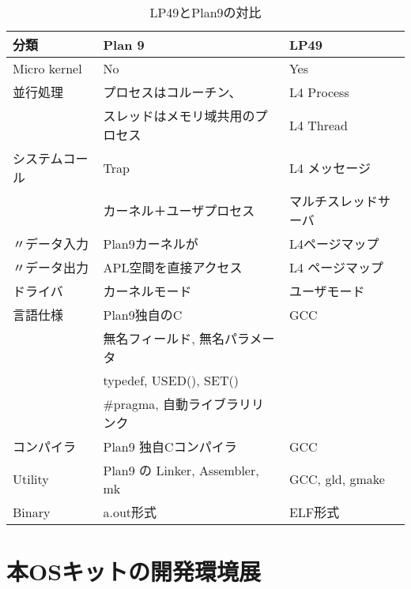 \documentclass[draft]{ipsjpapers}
\begin{document}
\begin{table}[htb]
\caption[Plan9vsLP40]{LP49とPlan9の対比 }
\label{table:LP49-Plan9}
\begin{center}
{\footnotesize 
\begin{tabular}{|l|l|l|}
\hline
 分類  & Plan 9 & LP49 \\
\hline

Micro kernel  &     No        &   Yes   \\
\hline

並行処理  &  プロセスはコルーチン、 &   L4 Process  \\
          &  スレッドはメモリ域共用のプロセス &  L4 Thread \\
\hline

システムコール    & Trap       &     L4 メッセージ \\
                  & カーネル＋ユーザプロセス    & マルチスレッドサーバ \\
\hline

〃データ入力      & Plan9カーネルが   & L4ページマップ \\
〃データ出力      & APL空間を直接アクセス          & L4 ページマップ \\
\hline

ドライバ     & カーネルモード    & ユーザモード  \\
\hline

言語仕様 &  Plan9独自のC                     &   GCC  　\\
         &  無名フィールド, 無名パラメータ   & \\
         &  typedef, USED(), SET()           &    \\
         &   \#pragma, 自動ライブラリリンク  & \\
\hline

コンパイラ  &   Plan9 独自Cコンパイラ   &   GCC \\
\hline

 Utility  &  Plan9 の Linker, Assembler, mk    & GCC, gld, gmake \\
\hline

Binary    &  a.out形式         &    ELF形式 \\
\hline

\end{tabular}
}
\end{center}
\end{table}


\section{本OSキットの開発環境展}
\end{document}

